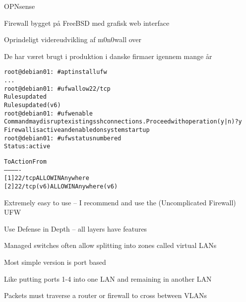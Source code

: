 \documentclass[Screen16to9,17pt]{foils}
\begin{document}
\begin{list1}
\item OPNsense 
\item Firewall bygget på FreeBSD med grafisk web interface
\item Oprindeligt videreudvikling af m0n0wall over \\
\item De har været brugt i produktion i danske firmaer igennem mange år
\end{list1}



\begin{alltt}\small
root@debian01:~# apt install ufw
...
root@debian01:~# ufw allow 22/tcp
Rules updated
Rules updated (v6)
root@debian01:~# ufw enable
Command may disrupt existing ssh connections. Proceed with operation (y|n)? y
Firewall is active and enabled on system startup
root@debian01:~# ufw status numbered
Status: active

     To                         Action      From
     --                         ------      ----
[ 1] 22/tcp                     ALLOW IN    Anywhere
[ 2] 22/tcp (v6)                ALLOW IN    Anywhere (v6)
\end{alltt}

\begin{list2}
\item Extremely easy to use -- I recommend and use the (Uncomplicated Firewall) UFW
\end{list2}



\centerline{Use Defense in Depth -- all layers have features}






\begin{list1}
\item Managed switches often allow splitting into zones called virtual LANs
\item Most simple version is port based
\item Like putting ports 1-4 into one LAN and remaining in another LAN
\item Packets must traverse a router or firewall to cross between VLANs
\end{list1}
\end{document}
